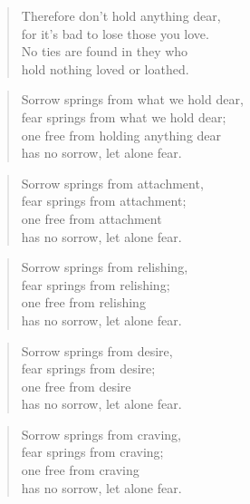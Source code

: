\documentclass[12pt,openany]{book}%
\begin{document}
\begin{verse}%
Therefore don’t hold anything dear, \\
for it’s bad to lose those you love. \\
No ties are found in they who \\
hold nothing loved or loathed. 

%
\end{verse}

\begin{verse}%
Sorrow springs from what we hold dear, \\
fear springs from what we hold dear; \\
one free from holding anything dear \\
has no sorrow, let alone fear. 

%
\end{verse}

\begin{verse}%
Sorrow springs from attachment, \\
fear springs from attachment; \\
one free from attachment \\
has no sorrow, let alone fear. 

%
\end{verse}

\begin{verse}%
Sorrow springs from relishing, \\
fear springs from relishing; \\
one free from relishing \\
has no sorrow, let alone fear. 

%
\end{verse}

\begin{verse}%
Sorrow springs from desire, \\
fear springs from desire; \\
one free from desire \\
has no sorrow, let alone fear. 

%
\end{verse}

\begin{verse}%
Sorrow springs from craving, \\
fear springs from craving; \\
one free from craving \\
has no sorrow, let alone fear. 

%
\end{verse}
\end{document}
